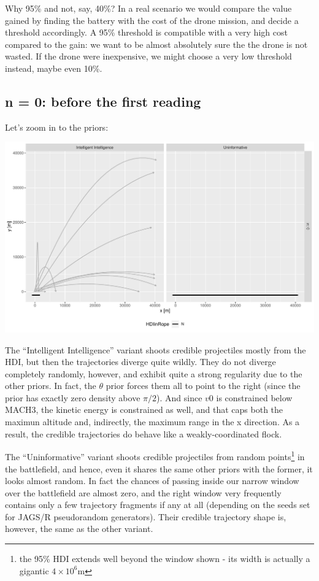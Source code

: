 \documentclass[]{article}
\begin{document}
Why 95\% and not, say, 40\%? In a real scenario we would compare the
value gained by finding the battery with the cost of the drone mission,
and decide a threshold accordingly. A 95\% threshold is compatible with
a very high cost compared to the gain: we want to be almost absolutely
sure the the drone is not wasted. If the drone were inexpensive, we
might choose a very low threshold instead, maybe even 10\%.

\hypertarget{n-0-before-the-first-reading}{%
\subsection{n = 0: before the first
reading}\label{n-0-before-the-first-reading}}

Let's zoom in to the priors:

\begin{center}\includegraphics[width=1.0\textwidth]{bayesian_artillery_files/figure-latex/plot_0-1} \end{center}

The ``Intelligent Intelligence'' variant shoots credible projectiles
mostly from the HDI, but then the trajectories diverge quite wildly.
They do not diverge completely randomly, however, and exhibit quite a
strong regularity due to the other priors. In fact, the \(\theta\) prior
forces them all to point to the right (since the prior has exactly zero
density above \(\pi/2\)). And since \(v0\) is constrained below MACH3,
the kinetic energy is constrained as well, and that caps both the
maximun altitude and, indirectly, the maximum range in the x direction.
As a result, the credible trajectories do behave like a
weakly-coordinated flock.

The ``Uninformative'' variant shoots credible projectiles from random
points\footnote{the 95\% HDI extends well beyond the window shown - its
  width is actually a gigantic \ensuremath{4\times 10^{6}}m} in the
battlefield, and hence, even it shares the same other priors with the
former, it looks almost random. In fact the chances of passing inside
our narrow window over the battlefield are almost zero, and the right
window very frequently contains only a few trajectory fragments if any
at all (depending on the seeds set for JAGS/R pseudorandom generators).
Their credible trajectory shape is, however, the same as the other
variant.
\end{document}
